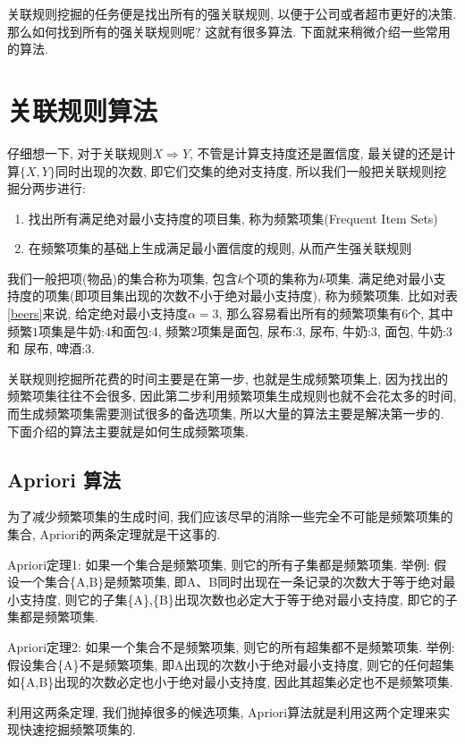 \documentclass[a4paper,UTF8]{ctexart}
\theoremstyle{plain} \newtheorem{theorem}{定理}[section]
\theoremstyle{plain} \newtheorem{definition}{定义}[section]
\theoremstyle{plain} \newtheorem{lemma}{引理}[section]
\theoremstyle{plain} \newtheorem{proposition}{命题}[section]
\theoremstyle{plain} \newtheorem{example}{例}[section]
\theoremstyle{plain} \newtheorem{remark}{注}[section]
\theoremstyle{plain} \newtheorem{corollary}{推论}[section]
\begin{document}
关联规则挖掘的任务便是找出所有的强关联规则, 以便于公司或者超市更好的决策. 那么如何找到所有的强关联规则呢? 这就有很多算法. 下面就来稍微介绍一些常用的算法.


\section{关联规则算法}
仔细想一下, 对于关联规则$X \Rightarrow Y$, 不管是计算支持度还是置信度, 最关键的还是计算$\{X,Y\}$同时出现的次数, 即它们交集的绝对支持度, 所以我们一般把关联规则挖掘分两步进行:
\begin{enumerate}[(1)]
\item 找出所有满足绝对最小支持度的项目集, 称为频繁项集(Frequent Item Sets)

\item 在频繁项集的基础上生成满足最小置信度的规则, 从而产生强关联规则
\end{enumerate}

我们一般把项(物品)的集合称为项集, 包含$k$个项的集称为$k$项集. 满足绝对最小支持度的项集(即项目集出现的次数不小于绝对最小支持度), 称为频繁项集. 比如对表\ref{beers}来说, 给定绝对最小支持度$\alpha = 3$, 那么容易看出所有的频繁项集有$6$个, 其中频繁$1$项集是{牛奶:4}和{面包:4}, 频繁$2$项集是{面包, 尿布:3}, {尿布, 牛奶:3}, {面包, 牛奶:3} 和 {尿布, 啤酒:3}.

关联规则挖掘所花费的时间主要是在第一步, 也就是生成频繁项集上, 因为找出的频繁项集往往不会很多, 因此第二步利用频繁项集生成规则也就不会花太多的时间,而生成频繁项集需要测试很多的备选项集, 所以大量的算法主要是解决第一步的. 下面介绍的算法主要就是如何生成频繁项集.


\subsection{Apriori 算法}
为了减少频繁项集的生成时间, 我们应该尽早的消除一些完全不可能是频繁项集的集合, Apriori的两条定理就是干这事的.

Apriori定理1: 如果一个集合是频繁项集, 则它的所有子集都是频繁项集. 举例: 假设一个集合\{A,B\}是频繁项集, 即A、B同时出现在一条记录的次数大于等于绝对最小支持度, 则它的子集\{A\},\{B\}出现次数也必定大于等于绝对最小支持度, 即它的子集都是频繁项集.

Apriori定理2: 如果一个集合不是频繁项集, 则它的所有超集都不是频繁项集. 举例: 假设集合\{A\}不是频繁项集, 即A出现的次数小于绝对最小支持度, 则它的任何超集如\{A,B\}出现的次数必定也小于绝对最小支持度, 因此其超集必定也不是频繁项集.

利用这两条定理, 我们抛掉很多的候选项集, Apriori算法就是利用这两个定理来实现快速挖掘频繁项集的.
\end{document}
